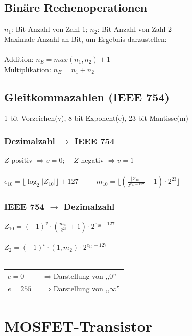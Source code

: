 \documentclass[a4paper,twocolumn,10pt]{article}
\begin{document}
\subsection*{Binäre Rechenoperationen}
$n_1$: Bit-Anzahl von Zahl 1; $n_2$: Bit-Anzahl von Zahl 2\\
Maximale Anzahl an Bit, um Ergebnis darzustellen:\\\\
Addition: $n_E=max(n_1,n_2)+1$\\
Multiplikation: $n_E=n_1+n_2$

\subsection*{Gleitkommazahlen (IEEE 754)}
1 bit Vorzeichen(v), 8 bit Exponent(e), 23 bit Mantisse(m)
\subsubsection*{Dezimalzahl $\rightarrow$ IEEE 754}
$Z$ positiv $\Rightarrow v=0;\;\;\;\;Z$ negativ $\Rightarrow v=1$\\\\
$e_{10}=\lfloor \log_2|Z_{10}| \rfloor+127\;\;\;\;\;\;\;\;\;m_{10}= \lfloor(\frac{|Z_{10}|}{2^{e_{10}-127}}-1)\cdot 2^{23}\rfloor$

\subsubsection*{IEEE 754 $\rightarrow$ Dezimalzahl}
$Z_{10}=(-1)^v\cdot (\frac{m_{10}}{2^{23}}+1)\cdot 2^{e_{10}-127}$\\\\
$Z_2=(-1)^v\cdot(1,m_2)\cdot 2^{e_{10}-127}$\\\\
\begin{tabular}{@{}l@{}l}
$e=0$ & $\;\;\Rightarrow$Darstellung von ,,0''\\
$e=255$ & $\;\;\Rightarrow$Darstellung von ,,$\infty$''
\end{tabular}

\section*{MOSFET-Transistor}
\end{document}
